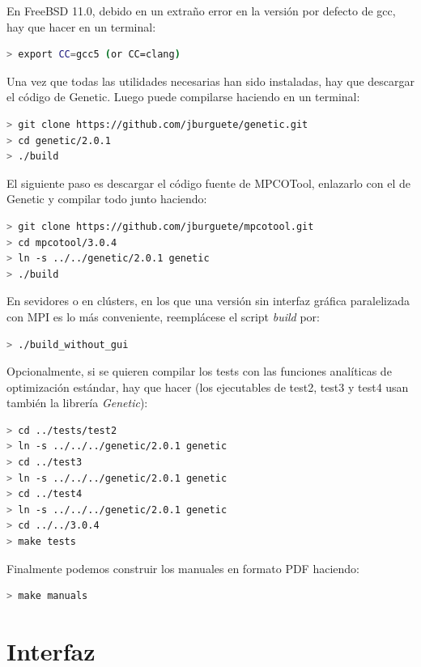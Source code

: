 \documentclass[a4paper]{report}
\begin{document}
En FreeBSD 11.0, debido en un extraño error en la versión por defecto de gcc, hay que hacer en un terminal:
\begin{lstlisting}[language=bash,basicstyle=\scriptsize]
> export CC=gcc5 (or CC=clang)
\end{lstlisting}

Una vez que todas las utilidades necesarias han sido instaladas, hay que
descargar el código de Genetic. Luego puede compilarse haciendo en un terminal:
\begin{lstlisting}[language=bash,basicstyle=\scriptsize]
> git clone https://github.com/jburguete/genetic.git
> cd genetic/2.0.1
> ./build
\end{lstlisting}

El siguiente paso es descargar el código fuente de MPCOTool, enlazarlo con el
de Genetic y compilar todo junto haciendo:
\begin{lstlisting}[language=bash,basicstyle=\scriptsize]
> git clone https://github.com/jburguete/mpcotool.git
> cd mpcotool/3.0.4
> ln -s ../../genetic/2.0.1 genetic
> ./build
\end{lstlisting}

En sevidores o en clústers, en los que una versión sin interfaz gráfica
paralelizada con MPI es lo más conveniente, reemplácese el script \emph{build}
por:
\begin{lstlisting}[language=bash,basicstyle=\scriptsize]
> ./build_without_gui
\end{lstlisting}
 
Opcionalmente, si se quieren compilar los tests con las funciones analíticas de
optimización estándar, hay que hacer (los ejecutables de test2, test3 y test4
usan también la librería \emph{Genetic}):
\begin{lstlisting}[language=bash,basicstyle=\scriptsize]
> cd ../tests/test2
> ln -s ../../../genetic/2.0.1 genetic
> cd ../test3
> ln -s ../../../genetic/2.0.1 genetic
> cd ../test4
> ln -s ../../../genetic/2.0.1 genetic
> cd ../../3.0.4
> make tests
\end{lstlisting}

Finalmente podemos construir los manuales en formato PDF haciendo:
\begin{lstlisting}[language=bash,basicstyle=\scriptsize]
> make manuals
\end{lstlisting}

\chapter{Interfaz}
\end{document}
